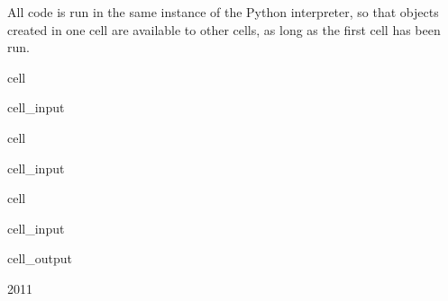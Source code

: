 \documentclass[letterpaper,10pt,english]{jupyterBook}
\begin{document}
\sphinxAtStartPar
All code is run in the same instance of the Python interpreter, so that objects created in one cell are available to other cells, as long as the first cell has been run.

\begin{sphinxuseclass}{cell}\begin{sphinxVerbatimInput}

\begin{sphinxuseclass}{cell_input}
\begin{sphinxVerbatim}[commandchars=\\\{\}]
     
\end{sphinxVerbatim}

\end{sphinxuseclass}\end{sphinxVerbatimInput}

\end{sphinxuseclass}
\begin{sphinxuseclass}{cell}\begin{sphinxVerbatimInput}

\begin{sphinxuseclass}{cell_input}
\begin{sphinxVerbatim}[commandchars=\\\{\}]
  
\end{sphinxVerbatim}

\end{sphinxuseclass}\end{sphinxVerbatimInput}

\end{sphinxuseclass}
\begin{sphinxuseclass}{cell}\begin{sphinxVerbatimInput}

\begin{sphinxuseclass}{cell_input}
\begin{sphinxVerbatim}[commandchars=\\\{\}]
\end{sphinxVerbatim}

\end{sphinxuseclass}\end{sphinxVerbatimInput}
\begin{sphinxVerbatimOutput}

\begin{sphinxuseclass}{cell_output}
\begin{sphinxVerbatim}[commandchars=\\\{\}]
2011
\end{sphinxVerbatim}

\end{sphinxuseclass}\end{sphinxVerbatimOutput}

\end{sphinxuseclass}
\end{document}
